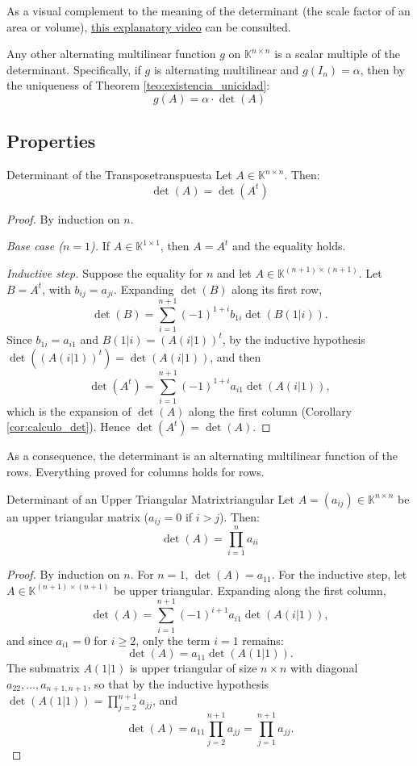 \documentclass[11pt, a4paper]{article}
\begin{document}
\obs As a visual complement to the meaning of the determinant (the scale factor of an area or volume), \href{https://www.youtube.com/watch?v=Ip3X9LOh2dk}{this explanatory video} can be consulted.

\obs Any other alternating multilinear function $g$ on $\mathbb{K}^{n \times n}$ is a scalar multiple of the determinant.
Specifically, if $g$ is alternating multilinear and $g(I_n) = \alpha$, then by the uniqueness of Theorem \ref{teo:existencia_unicidad}:
\[ g(A) = \alpha \cdot \det(A) \]

\subsection{Properties}

\begin{proposicion}{Determinant of the Transpose}{transpuesta}
Let $A \in \mathbb{K}^{n \times n}$. Then:
\[ \det(A) = \det(A^t) \]
\end{proposicion}

\begin{proof}
By induction on $n$.

\textit{Base case ($n=1$).} If $A \in \mathbb{K}^{1 \times 1}$, then $A = A^t$ and the equality holds.

\textit{Inductive step.} Suppose the equality for $n$ and let $A \in \mathbb{K}^{(n+1) \times (n+1)}$. Let $B = A^t$, with $b_{ij} = a_{ji}$. Expanding $\det(B)$ along its first row,
\[
\det(B) = \sum_{i=1}^{n+1} (-1)^{1+i} b_{1i} \det(B(1|i)).
\]
Since $b_{1i} = a_{i1}$ and $B(1|i) = (A(i|1))^t$, by the inductive hypothesis $\det((A(i|1))^t) = \det(A(i|1))$, and then
\[
\det(A^t) = \sum_{i=1}^{n+1} (-1)^{1+i} a_{i1} \det(A(i|1)),
\]
which is the expansion of $\det(A)$ along the first column (Corollary \ref{cor:calculo_det}). Hence $\det(A^t) = \det(A)$.
\end{proof}

\obs As a consequence, the determinant is an alternating multilinear function of the rows. Everything proved for columns holds for rows.

\begin{proposicion}{Determinant of an Upper Triangular Matrix}{triangular}
Let $A = (a_{ij}) \in \mathbb{K}^{n \times n}$ be an upper triangular matrix ($a_{ij} = 0$ if $i > j$). Then:
\[ \det(A) = \prod_{i=1}^n a_{ii} \]
\end{proposicion}

\begin{proof}
By induction on $n$. For $n=1$, $\det(A) = a_{11}$. For the inductive step, let $A \in \mathbb{K}^{(n+1) \times (n+1)}$ be upper triangular. Expanding along the first column,
\[
\det(A) = \sum_{i=1}^{n+1} (-1)^{i+1} a_{i1} \det(A(i|1)),
\]
and since $a_{i1} = 0$ for $i \ge 2$, only the term $i=1$ remains:
\[
\det(A) = a_{11} \det(A(1|1)).
\]
The submatrix $A(1|1)$ is upper triangular of size $n \times n$ with diagonal $a_{22}, \dots, a_{n+1,n+1}$, so that by the inductive hypothesis $\det(A(1|1)) = \prod_{j=2}^{n+1} a_{jj}$, and
\[
\det(A) = a_{11} \prod_{j=2}^{n+1} a_{jj} = \prod_{j=1}^{n+1} a_{jj}.
\]
\end{proof}
\end{document}
